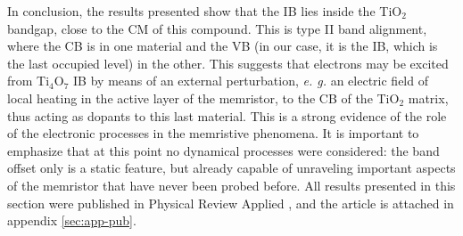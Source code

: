 In conclusion, the results presented show that the IB lies inside the TiO$_2$ bandgap, close to the CM of this compound. This is type II band alignment, where the CB is in one material and the VB (in our case, it is the IB, which is the last occupied level) in the other. This suggests that electrons may be excited from Ti$_4$O$_7$ IB by means of an external perturbation, \textit{e. g.} an electric field of local heating in the active layer of the memristor, to the CB of the TiO$_2$ matrix, thus acting as dopants to this last material. This is a strong evidence of the role of the electronic processes in the memristive phenomena. It is important to emphasize that at this point no dynamical processes were considered: the band offset only is a static feature, but already capable of unraveling important aspects of the memristor that have never been probed before. All results presented in this section were published in Physical Review Applied \cite{Padilha2015}, and the article is attached in appendix \ref{sec:app-pub}.